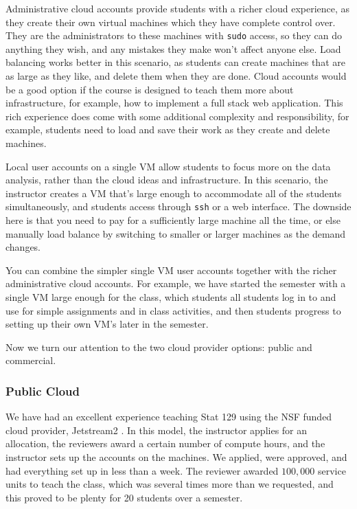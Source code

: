 \documentclass[12pt]{article}
\begin{document}
Administrative cloud accounts provide students with a richer cloud experience, as they create their own virtual machines which they have complete control over.
They are the administrators to these machines with \texttt{sudo} access, so they can do anything they wish, and any mistakes they make won't affect anyone else.
Load balancing works better in this scenario, as students can create machines that are as large as they like, and delete them when they are done.
Cloud accounts would be a good option if the course is designed to teach them more about infrastructure, for example, how to implement a full stack web application.
This rich experience does come with some additional complexity and responsibility, for example, students need to load and save their work as they create and delete machines.

Local user accounts on a single VM allow students to focus more on the data analysis, rather than the cloud ideas and infrastructure.
In this scenario, the instructor creates a VM that's large enough to accommodate all of the students simultaneously, and students access through \texttt{ssh} or a web interface.
The downside here is that you need to pay for a sufficiently large machine all the time, or else manually load balance by switching to smaller or larger machines as the demand changes.

You can combine the simpler single VM user accounts together with the richer administrative cloud accounts.
For example, we have started the semester with a single VM large enough for the class, which students all students log in to and use for simple assignments and in class activities, and then students progress to setting up their own VM's later in the semester.

Now we turn our attention to the two cloud provider options: public and commercial.



\subsubsection{Public Cloud}

We have had an excellent experience teaching Stat 129 using the NSF funded cloud provider, Jetstream2 \cite{hancock2021jetstream2}.
In this model, the instructor applies for an allocation, the reviewers award a certain number of compute hours, and the instructor sets up the accounts on the machines.
We applied, were approved, and had everything set up in less than a week.
The reviewer awarded $100,000$ service units to teach the class, which was several times more than we requested, and this proved to be plenty for 20 students over a semester.
\end{document}
